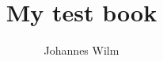 \documentclass[11pt]{book}
\title{My test book}
\author{Johannes Wilm}
\begin{document}
\maketitle
\def\title#1{\chapter{#1}}
\tableofcontents

        
        
\end{document}
